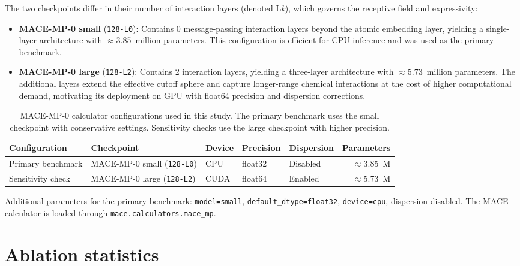 \documentclass[%
 preprint,
 superscriptaddress,
 amsmath,amssymb,
 aps,
 prb,
 floatfix,
]{revtex4-2}
\begin{document}
The two checkpoints differ in their number of interaction layers (denoted L\emph{k}), which governs the receptive field and expressivity:
\begin{itemize}
    \item \textbf{MACE-MP-0 small} (\texttt{128-L0}): Contains 0 message-passing interaction layers beyond the atomic embedding layer, yielding a single-layer architecture with $\approx$3.85~million parameters. This configuration is efficient for CPU inference and was used as the primary benchmark.
    \item \textbf{MACE-MP-0 large} (\texttt{128-L2}): Contains 2 interaction layers, yielding a three-layer architecture with $\approx$5.73~million parameters. The additional layers extend the effective cutoff sphere and capture longer-range chemical interactions at the cost of higher computational demand, motivating its deployment on GPU with float64 precision and dispersion corrections.
\end{itemize}

\begin{table}[ht]
\centering
\caption{MACE-MP-0 calculator configurations used in this study. The primary benchmark uses the small checkpoint with conservative settings. Sensitivity checks use the large checkpoint with higher precision.}
\label{tab:mace_config}
\begin{tabular}{lllllr}
\toprule
Configuration & Checkpoint & Device & Precision & Dispersion & Parameters \\
\midrule
Primary benchmark & MACE-MP-0 small (\texttt{128-L0}) & CPU & float32 & Disabled & $\approx$3.85~M \\
Sensitivity check & MACE-MP-0 large  (\texttt{128-L2}) & CUDA & float64 & Enabled  & $\approx$5.73~M \\
\bottomrule
\end{tabular}
\end{table}

Additional parameters for the primary benchmark: \texttt{model=small}, \texttt{default\_dtype=float32}, \texttt{device=cpu}, dispersion disabled. The MACE calculator is loaded through \texttt{mace.calculators.mace\_mp}.

\clearpage

\section{Ablation statistics}
\end{document}
